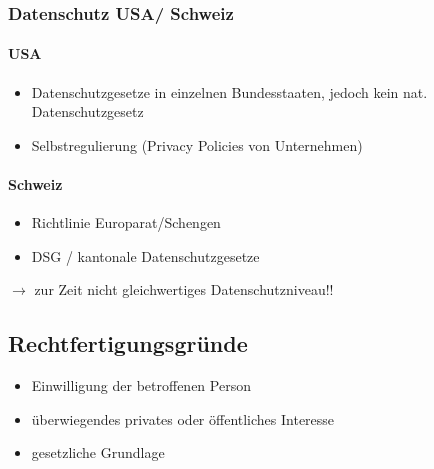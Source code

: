 \subsubsection{Datenschutz USA/ Schweiz}
\begin{minipage}{0.5\linewidth}
    \paragraph{USA}
    \begin{itemize}
        \item Datenschutzgesetze in einzelnen Bundesstaaten, jedoch kein nat. Datenschutzgesetz
        \item Selbstregulierung (Privacy Policies von Unternehmen)
    \end{itemize}
\end{minipage}
\begin{minipage}{0.5\linewidth}
    \paragraph{Schweiz}
    \begin{itemize}
        \item Richtlinie Europarat/Schengen
        \item DSG / kantonale Datenschutzgesetze\\
    \end{itemize}
\end{minipage}
$\rightarrow$ zur Zeit nicht gleichwertiges Datenschutzniveau!!

\subsection{Rechtfertigungsgründe}
\begin{itemize}
    \item Einwilligung der betroffenen Person
    \item überwiegendes privates oder öffentliches Interesse
    \item gesetzliche Grundlage
\end{itemize}

